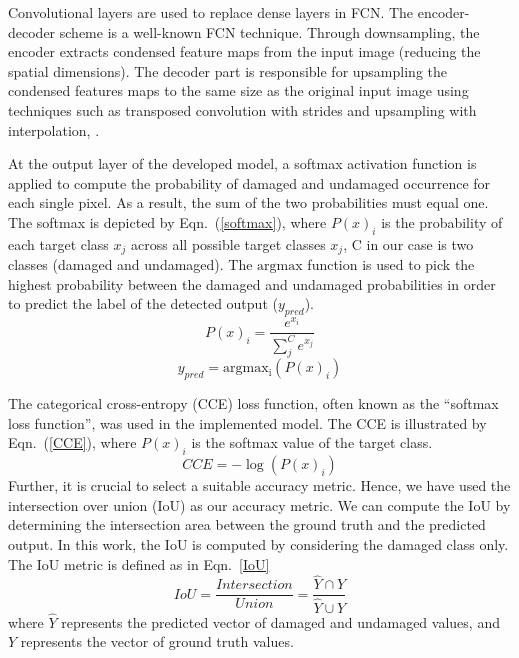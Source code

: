 \documentclass[runningheads]{llncs}
\begin{document}
Convolutional layers are used to replace dense layers in FCN.
The encoder-decoder scheme is a well-known FCN technique.
Through downsampling, the encoder extracts condensed feature maps from the input image (reducing the spatial dimensions).
The decoder part is responsible for upsampling the condensed features maps to the same size as the original input image using techniques such as transposed convolution with strides and upsampling with interpolation, .

At the output layer of the developed model, a softmax activation function is applied to compute the probability of damaged and undamaged occurrence for each single pixel.
As a result, the sum of the two probabilities must equal one.
The softmax is depicted by Eqn.~(\ref{softmax}), where \(P(x)_{i}\) is the probability of each target class  \(x_{j}\) across all possible target classes \(x_{j}\), C in our case is two classes (damaged and undamaged).
The \(\mathrm{argmax}\) function is used to pick the highest probability between the damaged and undamaged probabilities in order to predict the label of the detected output (\(y_{pred}\)).
\begin{equation}
	P(x)_{i} = \frac{e^{x_{i}}}{\sum_{j}^{C} e^{x_{j}}}
	\label{softmax}
\end{equation} 
\begin{equation}
	y_{pred} = \mathrm{argmax_{i}}\left( P(x)_{i} \right)
	\label{argmax}
\end{equation}

The categorical cross-entropy (CCE) loss function, often known as the  \enquote{softmax loss function}, was used in the implemented model.
The CCE is illustrated by Eqn.~(\ref{CCE}), where \( P(x)_{i}\) is the  softmax value of the target class. 
\begin{equation}
	CCE = -\log\left( P(x)_{i} \right)
	\label{CCE}
\end{equation}
Further, it is crucial to select a suitable accuracy metric.
Hence, we have used the intersection over union (IoU) as our accuracy metric. 
We can compute the IoU by determining the intersection area between the ground truth and the predicted output.
In this work,  the IoU is computed by considering the damaged class only.
The IoU metric is defined as in Eqn.~\ref{IoU}
\begin{equation}
	IoU = \frac{Intersection}{Union} = \frac{\hat{Y} \cap Y}{\hat{Y} \cup Y} 
	\label{IoU}
\end{equation}
where \(\hat{Y}\) represents the predicted vector of damaged and undamaged values, and \(Y\) represents the vector of ground truth values.
\end{document}
